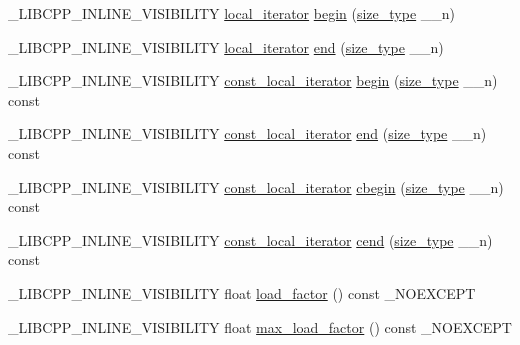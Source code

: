 \begin{DoxyCompactItemize}
\+\_\+\+L\+I\+B\+C\+P\+P\+\_\+\+I\+N\+L\+I\+N\+E\+\_\+\+V\+I\+S\+I\+B\+I\+L\+I\+T\+Y \hyperlink{class__map_a715fe122a46eecc92c19958b56ed91e4}{local\+\_\+iterator} \hyperlink{class__map_a8c27e1048606b16ea37f60b80441acb6}{begin} (\hyperlink{class__map_adc37f621be25fda072b12873e60e9fc7}{size\+\_\+type} \+\_\+\+\_\+n)
\item 
\+\_\+\+L\+I\+B\+C\+P\+P\+\_\+\+I\+N\+L\+I\+N\+E\+\_\+\+V\+I\+S\+I\+B\+I\+L\+I\+T\+Y \hyperlink{class__map_a715fe122a46eecc92c19958b56ed91e4}{local\+\_\+iterator} \hyperlink{class__map_afdf3043fb9e09154aa3a928c544f9c5c}{end} (\hyperlink{class__map_adc37f621be25fda072b12873e60e9fc7}{size\+\_\+type} \+\_\+\+\_\+n)
\item 
\+\_\+\+L\+I\+B\+C\+P\+P\+\_\+\+I\+N\+L\+I\+N\+E\+\_\+\+V\+I\+S\+I\+B\+I\+L\+I\+T\+Y \hyperlink{class__map_aa447944b5b72b05cb3d909f7ac48d2d7}{const\+\_\+local\+\_\+iterator} \hyperlink{class__map_a0b575c9f272b53d9d1ac50ee5f87e38c}{begin} (\hyperlink{class__map_adc37f621be25fda072b12873e60e9fc7}{size\+\_\+type} \+\_\+\+\_\+n) const 
\item 
\+\_\+\+L\+I\+B\+C\+P\+P\+\_\+\+I\+N\+L\+I\+N\+E\+\_\+\+V\+I\+S\+I\+B\+I\+L\+I\+T\+Y \hyperlink{class__map_aa447944b5b72b05cb3d909f7ac48d2d7}{const\+\_\+local\+\_\+iterator} \hyperlink{class__map_aaa1c77bafa711ea03859948bd1c87c0e}{end} (\hyperlink{class__map_adc37f621be25fda072b12873e60e9fc7}{size\+\_\+type} \+\_\+\+\_\+n) const 
\item 
\+\_\+\+L\+I\+B\+C\+P\+P\+\_\+\+I\+N\+L\+I\+N\+E\+\_\+\+V\+I\+S\+I\+B\+I\+L\+I\+T\+Y \hyperlink{class__map_aa447944b5b72b05cb3d909f7ac48d2d7}{const\+\_\+local\+\_\+iterator} \hyperlink{class__map_a54decb66c7ced898b24e6a0226494ff5}{cbegin} (\hyperlink{class__map_adc37f621be25fda072b12873e60e9fc7}{size\+\_\+type} \+\_\+\+\_\+n) const 
\item 
\+\_\+\+L\+I\+B\+C\+P\+P\+\_\+\+I\+N\+L\+I\+N\+E\+\_\+\+V\+I\+S\+I\+B\+I\+L\+I\+T\+Y \hyperlink{class__map_aa447944b5b72b05cb3d909f7ac48d2d7}{const\+\_\+local\+\_\+iterator} \hyperlink{class__map_a72c68c760d501ace94d48ae59620d3ad}{cend} (\hyperlink{class__map_adc37f621be25fda072b12873e60e9fc7}{size\+\_\+type} \+\_\+\+\_\+n) const 
\item 
\+\_\+\+L\+I\+B\+C\+P\+P\+\_\+\+I\+N\+L\+I\+N\+E\+\_\+\+V\+I\+S\+I\+B\+I\+L\+I\+T\+Y float \hyperlink{class__map_a2ff3f364994ab2a177740c1a5c7c634b}{load\+\_\+factor} () const \+\_\+\+N\+O\+E\+X\+C\+E\+P\+T
\item 
\+\_\+\+L\+I\+B\+C\+P\+P\+\_\+\+I\+N\+L\+I\+N\+E\+\_\+\+V\+I\+S\+I\+B\+I\+L\+I\+T\+Y float \hyperlink{class__map_a3b41b6b2d7924c4b7b4b8550b3b35a35}{max\+\_\+load\+\_\+factor} () const \+\_\+\+N\+O\+E\+X\+C\+E\+P\+T

\end{DoxyCompactItemize}
